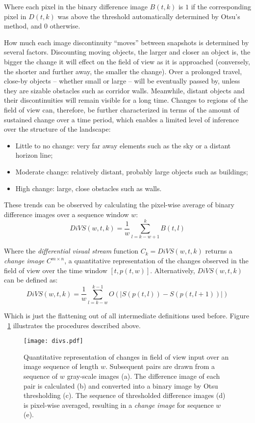 \documentclass[twocolumn, 9pt,fleqn]{jsproceedings}
\begin{document}
Where each pixel in the binary difference image $B(t, k)$ is $1$ if the corresponding pixel in $D(t, k)$ was above the threshold automatically determined by Otsu's method, and $0$ otherwise.

How much each image discontinuity ``moves'' between snapshots is determined by several factors. Discounting moving objects, the larger and closer an object is, the bigger the change it will effect on the field of view as it is approached (conversely, the shorter and further away, the smaller the change). Over a prolonged travel, close-by objects -- whether small or large -- will be eventually passed by, unless they are sizable obstacles such as corridor walls. Meanwhile, distant objects and their discontinuities will remain visible for a long time. Changes to regions of the field of view can, therefore, be further characterized in terms of the amount of sustained change over a time period, which enables a limited level of inference over the structure of the landscape:

\begin{itemize}
\item Little to no change: very far away elements such as the sky or a distant horizon line;
\item Moderate change: relatively distant, probably large objects such as buildings;
\item High change: large, close obstacles such as walls.
\end{itemize}

These trends can be observed by calculating the pixel-wise average of binary difference images over a sequence window $w$:
\begin{equation}
DiVS(w, t, k) = \frac{1}{w} \sum_{l=k-w+1}^{k}{B(t, l)}
\end{equation}

Where the \textit{differential visual stream} function $C_k = DiVS(w, t, k)$ returns a  \textit{change image} $C^{m \times n}$, a quantitative representation of the changes observed in the field of view over the time window $[t, p(t, w)]$. Alternatively, $DiVS(w, t, k)$ can be defined as:
\begin{equation}
DiVS(w, t, k) = \frac{1}{w} \sum_{l=k-w}^{k-1}{O(|S(p(t, l)) - S(p(t, l+1))|)}
\end{equation}

Which is just the flattening out of all intermediate definitions used before. Figure ~\ref{fig:divs} illustrates the procedures described above.

\begin{figure}[h!]
\texttt{[image: divs.pdf]}
\caption{Quantitative representation of changes in field of view input over an image sequence of length $w$. Subsequent pairs are drawn from a sequence of $w$ gray-scale images (a). The difference image of each pair is calculated (b) and converted into a binary image by Otsu thresholding (c). The sequence of thresholded difference images (d) is pixel-wise averaged, resulting in a \textit{change image} for sequence $w$ (e).}
\label{fig:divs}
\end{figure}
\end{document}
